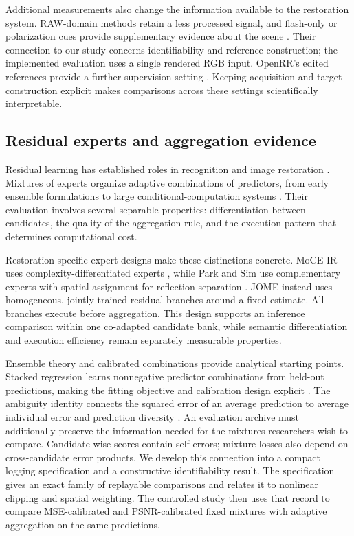 \documentclass[12pt]{article}
\begin{document}
Additional measurements also change the information available to the restoration system. RAW-domain methods retain a less processed signal, and flash-only or polarization cues provide supplementary evidence about the scene \citep{kee2025raw,lei2023flash,yao2025polarfree}. Their connection to our study concerns identifiability and reference construction; the implemented evaluation uses a single rendered RGB input. OpenRR's edited references provide a further supervision setting \citep{cai2025openrr}. Keeping acquisition and target construction explicit makes comparisons across these settings scientifically interpretable.

\subsection{Residual experts and aggregation evidence}
Residual learning has established roles in recognition and image restoration \citep{he2016resnet,zhang2017dncnn}. Mixtures of experts organize adaptive combinations of predictors, from early ensemble formulations to large conditional-computation systems \citep{jacobs1991adaptive,shazeer2017outrageously}. Their evaluation involves several separable properties: differentiation between candidates, the quality of the aggregation rule, and the execution pattern that determines computational cost.

Restoration-specific expert designs make these distinctions concrete. MoCE-IR uses complexity-differentiated experts \citep{zamfir2025moce}, while Park and Sim use complementary experts with spatial assignment for reflection separation \citep{park2026complementary}. JOME instead uses homogeneous, jointly trained residual branches around a fixed estimate. All branches execute before aggregation. This design supports an inference comparison within one co-adapted candidate bank, while semantic differentiation and execution efficiency remain separately measurable properties.

Ensemble theory and calibrated combinations provide analytical starting points. Stacked regression learns nonnegative predictor combinations from held-out predictions, making the fitting objective and calibration design explicit \citep{breiman1996stacked}. The ambiguity identity connects the squared error of an average prediction to average individual error and prediction diversity \citep{krogh1994ensembles}. An evaluation archive must additionally preserve the information needed for the mixtures researchers wish to compare. Candidate-wise scores contain self-errors; mixture losses also depend on cross-candidate error products. We develop this connection into a compact logging specification and a constructive identifiability result. The specification gives an exact family of replayable comparisons and relates it to nonlinear clipping and spatial weighting. The controlled study then uses that record to compare MSE-calibrated and PSNR-calibrated fixed mixtures with adaptive aggregation on the same predictions.
\end{document}
